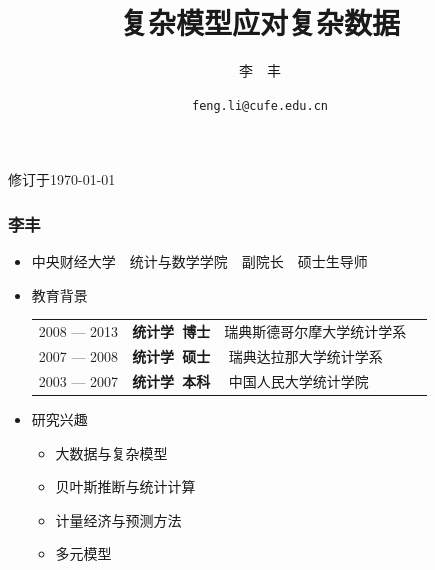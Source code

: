 \documentclass[11pt]{beamer}
\title[复杂模型应对复杂数据]{复杂模型应对复杂数据}
\author[李丰]{\large{李~~丰}}
\institute[中央财经大学]{\large{中央财经大学·统计与数学学院}}
\date{\texttt{feng.li@cufe.edu.cn}}
\begin{document}
\begin{frame}[plain]
  \titlepage
  \tiny{修订于\today}
\end{frame}


\begin{frame}
  \frametitle{李丰}

  \begin{itemize}

  \item  中央财经大学~~统计与数学学院~~副院长~~硕士生导师

  \item 教育背景

    \begin{tabular}{ l  p{} l}
      2008 --- 2013 &\textbf{统计学~博士}~~瑞典斯德哥尔摩大学统计学系\\

      2007 --- 2008 & \textbf{统计学~硕士}~~ 瑞典达拉那大学统计学系\\

      2003 --- 2007 & \textbf{统计学~本科}~~ 中国人民大学统计学院\\
    \end{tabular}

  \item 研究兴趣

    \begin{itemize}
    \item 大数据与复杂模型
    \item 贝叶斯推断与统计计算
    \item 计量经济与预测方法
    \item 多元模型

    \end{itemize}

  \end{itemize}


\end{frame}



\end{document}
